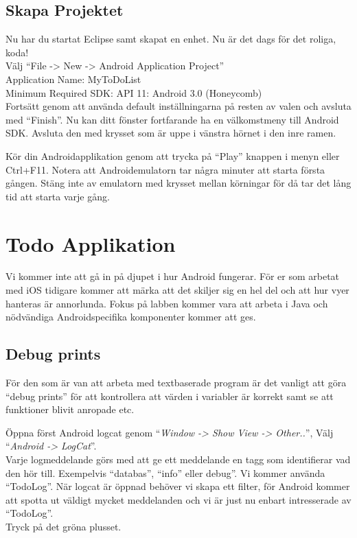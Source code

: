 \documentclass[11 pt, titlepage]{article} %
\begin{document}
\subsection{Skapa Projektet}
Nu har du startat Eclipse samt skapat en enhet. 
Nu är det dags för det roliga, koda!\\

Välj “File -> New -> Android Application Project”\\ 
Application Name:  MyToDoList\\
Minimum Required SDK:  API 11: Android 3.0 (Honeycomb)\\
Fortsätt genom att använda default inställningarna på resten av valen och avsluta med “Finish”. 
Nu kan ditt fönster fortfarande ha en välkomstmeny till Android SDK. 
Avsluta den med krysset som är uppe i vänstra hörnet i den inre ramen.

Kör din Androidapplikation genom att trycka på “Play” knappen i menyn eller Ctrl+F11. 
Notera att Androidemulatorn tar några minuter att starta första gången. 
Stäng inte av emulatorn med krysset mellan körningar för då tar det lång tid att starta varje gång.

\section{Todo Applikation}
Vi kommer inte att gå in på djupet i hur Android fungerar. 
För er som arbetat med iOS tidigare kommer att märka att det skiljer sig en hel del och att hur vyer hanteras är annorlunda. 
Fokus på labben kommer vara att arbeta i Java och nödvändiga Androidspecifika komponenter kommer att ges.
\subsection{Debug prints}
För den som är van att arbeta med textbaserade program är det vanligt att göra “debug prints” för att kontrollera att värden i variabler är korrekt samt se att funktioner blivit anropade etc.

Öppna först Android logcat genom “\textit{Window -> Show View -> Other..}”, Välj “\textit{Android -> LogCat}”.\\
Varje logmeddelande görs med att ge ett meddelande en tagg som identifierar vad den hör till. 
Exempelvis “databas”, “info” eller debug”. 
Vi kommer använda “TodoLog”. 
När logcat är öppnad behöver vi skapa ett filter, för Android kommer att spotta ut väldigt mycket meddelanden och vi är just nu enbart intresserade av “TodoLog”.\\ 
Tryck på det gröna plusset.\\
\end{document}
